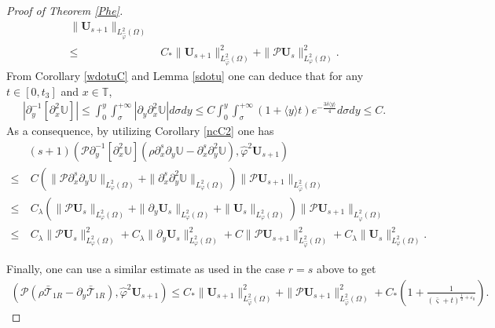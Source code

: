 \documentclass{amsart}
\numberwithin{equation}{section}
\newcommand\y{{{\langle y \rangle}}}
\begin{document}
\begin{proof}[Proof of Theorem \ref{Phe}]
\begin{align}
       \|\mathbf{U}_{s+1}\|_{L_{\hat{\varphi}}^{2}(\Omega)}\nonumber\\
\leq&~C_{*}\|\mathbf{U}_{s+1}\|_{L_{\hat{\varphi}}^{2}(\Omega)}^{2}
     +\|\mathcal{P}\mathbf{U}_{s}\|_{L_{\varphi}^{2}(\Omega)}^{2}.\nonumber
\end{align}
From Corollary \ref{wdotuC} and Lemma \ref{sdotu} one can deduce that for any $t\in[0,t_{3}]$ and $x\in\mathbb{T}$,
\begin{align*}
|\partial_{y}^{-1}[\partial_{x}^{2}\mathbb{U}]|
\leq \int_{0}^{y}\int_{\sigma}^{+\infty}|\partial_{y}\partial_{x}^{2}\mathbb{U}|d\sigma dy
\leq C\int_{0}^{y}\int_{\sigma}^{+\infty}(1+\y t)e^{-\frac{3\delta\y}{4}}d\sigma dy
\leq C.
\end{align*}
As a consequence,  by utilizing Corollary \ref{ncC2} one has
\begin{align}\label{J64'}
&(s+1)\left(\mathcal{P}\partial_{y}^{-1}[\partial_{x}^{2}\mathbb{U}](\rho\partial_{x}^{s}\partial_{y}\mathbb{U}-\partial_{x}^{s}\partial_{y}^{2}\mathbb{U}),\hat{\varphi}^{2}\mathbf{U}_{s+1}\right)\\
\leq&~C\left(\|\mathcal{P}\partial_{x}^{s}\partial_{y}\mathbb{U}\|_{L_{\varphi}^{2}(\Omega)}
             +\|\partial_{x}^{s}\partial_{y}^{2}\mathbb{U}\|_{L_{\varphi}^{2}(\Omega)}\right)
       \|\mathcal{P}\mathbf{U}_{s+1}\|_{L_{\hat{\varphi}}^{2}(\Omega)}\nonumber\\
\leq&~C_{\lambda}\left(\|\mathcal{P}\mathbf{U}_{s}\|_{L_{\varphi}^{2}(\Omega)}
             +\|\partial_{y}\mathbf{U}_{s}\|_{L_{\varphi}^{2}(\Omega)}
             +\|\mathbf{U}_{s}\|_{L_{\varphi}^{2}(\Omega)}\right)
       \|\mathcal{P}\mathbf{U}_{s+1}\|_{L_{\hat{\varphi}}^{2}(\Omega)}\nonumber\\
\leq&~C_{\lambda}\|\mathcal{P}\mathbf{U}_{s}\|_{L_{\varphi}^{2}(\Omega)}^{2}
     +C_{\lambda}\|\partial_{y}\mathbf{U}_{s}\|_{L_{\varphi}^{2}(\Omega)}^{2}
     +C\|\mathcal{P}\mathbf{U}_{s+1}\|_{L_{\hat{\varphi}}^{2}(\Omega)}^{2}
     +C_{\lambda}\|\mathbf{U}_{s}\|_{L_{\varphi}^{2}(\Omega)}^{2}\nonumber.
\end{align}

Finally, one can use a similar estimate as used in the case $r=s$ above to get
\begin{align}\label{J65}
\left(\mathcal{P}(\rho\bar{\mathcal{T}}_{1R}-\partial_{y}\bar{\mathcal{T}}_{1R}),\hat{\varphi}^{2}\mathbf{U}_{s+1}\right)
\leq  C_{*}\|\mathbf{U}_{s+1}\|_{L_{\hat{\varphi}}^{2}(\Omega)}^{2}
     +\|\mathcal{P}\mathbf{U}_{s+1}\|_{L_{\hat{\varphi}}^{2}(\Omega)}^{2}
     +C_{*}\left(1+\frac{1}{(\bar{\varsigma}+t)^{\frac{1}{2}+\varepsilon_{0}}}\right).
\end{align}


\end{proof}
\end{document}
